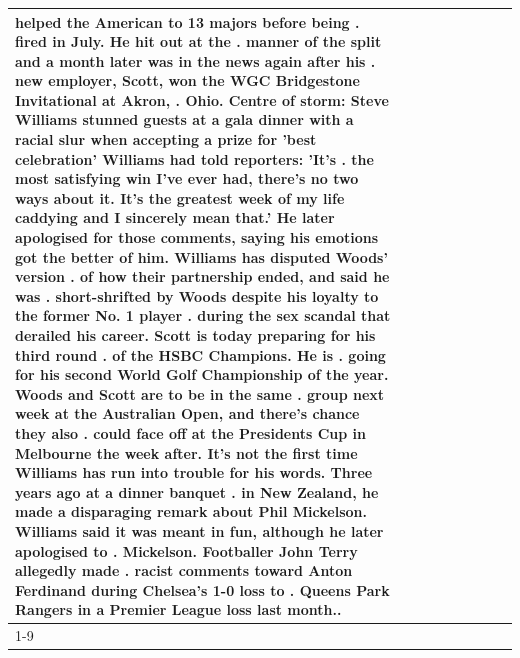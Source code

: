 \begin{table}[H]
\begin{tabular}{lllrlllll}
helped the American to 13 majors before being . fired in July. He hit out at the . manner of the split and a month later was in the news again after his . new employer, Scott, won the WGC Bridgestone Invitational at Akron, . Ohio. Centre of storm: Steve Williams stunned guests at a gala dinner with a racial slur when accepting a prize for 'best celebration' Williams had told reporters: 'It's . the most satisfying win I've ever had, there's no two ways about it. It's the greatest week of my life caddying and I sincerely mean that.' He later apologised for those comments, saying his emotions got the better of him. Williams has disputed Woods' version . of how their partnership ended, and said he was . short-shrifted by Woods despite his loyalty to the former No. 1 player . during the sex scandal that derailed his career. Scott is today preparing for his third round . of the HSBC Champions. He is . going for his second World Golf Championship of the year. Woods and Scott are to be in the same . group next week at the Australian Open, and there's chance they also . could face off at the Presidents Cup in Melbourne the week after. It's not the first time Williams has run into trouble for his words. Three years ago at a dinner banquet . in New Zealand, he made a disparaging remark about Phil Mickelson. Williams said it was meant in fun, although he later apologised to . Mickelson. Footballer John Terry allegedly made . racist comments toward Anton Ferdinand during Chelsea's 1-0 loss to . Queens Park Rangers in a Premier League loss last month.. \\
\cline{1-9}

\end{tabular}
\end{table}
